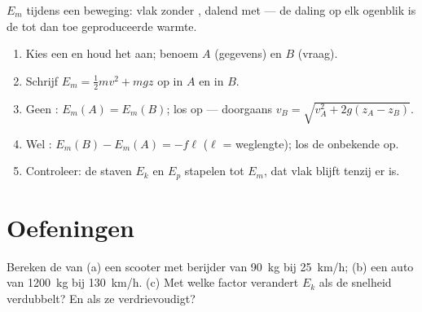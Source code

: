 \begin{omfigure}

{\small $E_m$ tijdens een beweging: vlak zonder , dalend met
 --- de daling op elk ogenblik is de tot dan toe geproduceerde
warmte.}
\end{omfigure}

\begin{method}[Energieboekhouding]\label{met:g11:mechanical-energy:bookkeeping}
\begin{enumerate}
  \item Kies een  en houd het aan; benoem $A$ (gegevens)
        en $B$ (vraag).
  \item Schrijf $E_m = \tfrac12 mv^2 + mgz$ op in $A$ en in $B$.
  \item Geen : $E_m(A) = E_m(B)$; los op --- doorgaans
        $v_B = \sqrt{v_A^2 + 2g(z_A - z_B)}$.
  \item Wel : $E_m(B) - E_m(A) = -f\ell$ ($\ell$ = weglengte);
        los de onbekende op.
  \item Controleer: de staven $E_k$ en $E_p$ stapelen tot $E_m$, dat vlak
        blijft tenzij er  is.
\end{enumerate}
\end{method}

\section{Oefeningen}

\begin{exercise}[$\star$]\label{exo:g11:mechanical-energy:1}
Bereken de  van (a) een scooter met berijder van
\qty{90}{kg} bij \qty{25}{km/h}; (b) een auto van \qty{1200}{kg} bij
\qty{130}{km/h}. (c) Met welke factor verandert $E_k$ als de snelheid
verdubbelt? En als ze verdrievoudigt?
\end{exercise}

